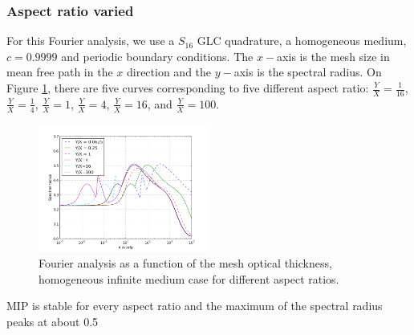 \subsubsection{Aspect ratio varied}
For this Fourier analysis, we use a $S_{16}$ GLC quadrature, a homogeneous
medium, $c=0.9999$ and periodic boundary conditions. The $x-$axis is the mesh
size in mean free path in the $x$ direction and the $y-$axis is the spectral
radius. On Figure \ref{fig_fa_ar}, there are five curves corresponding to five 
different aspect ratio: $\frac{Y}{X}=\frac{1}{16}$, $\frac{Y}{X}=\frac{1}{4}$, 
$\frac{Y}{X}=1$, $\frac{Y}{X}=4$, $\frac{Y}{X}=16$, and $\frac{Y}{X}=100$. 
\begin{figure}[H]
  \centering
  \includegraphics[width=0.5\textwidth]{./Dsa/aspect_ratio_9999_2}
  \caption{Fourier analysis as a function of the mesh optical thickness,
  homogeneous infinite medium case for different aspect ratios.}
  \label{fig_fa_ar}
\end{figure}
MIP is stable for every aspect ratio and the maximum of the spectral radius
peaks at about 0.5

